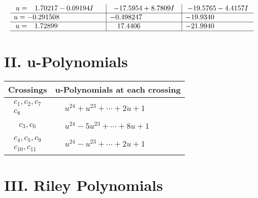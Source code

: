 \documentclass[1p]{elsarticle_modified}
\theoremstyle{definition}
\begin{document}
$$\begin{array}{c|c|c}
\begin{aligned}
u &= \phantom{-}1.70217 - 0.09194 I\end{aligned}
 & -17.5954 + 8.7809 I & -19.5765 - 4.4157 I \\ \hline\begin{aligned}
u &= -0.291508\phantom{ +0.000000I}\end{aligned}
 & -0.498247\phantom{ +0.000000I} & -19.9340\phantom{ +0.000000I} \\ \hline\begin{aligned}
u &= \phantom{-}1.72899\phantom{ +0.000000I}\end{aligned}
 & \phantom{-}17.4406\phantom{ +0.000000I} & -21.9940\phantom{ +0.000000I}\\
 \hline 
 \end{array}$$\newpage
\newpage\renewcommand{\arraystretch}{1}
\centering \section*{ II. u-Polynomials}
\begin{tabular}{m{50pt}|m{274pt}}
Crossings & \hspace{64pt}u-Polynomials at each crossing \\
\hline $$\begin{aligned}c_{1},c_{2},c_{7}\\c_{8}\end{aligned}$$&$\begin{aligned}
&u^{24}+u^{23}+\cdots+2 u+1
\end{aligned}$\\
\hline $$\begin{aligned}c_{3},c_{6}\end{aligned}$$&$\begin{aligned}
&u^{24}-5 u^{23}+\cdots+8 u+1
\end{aligned}$\\
\hline $$\begin{aligned}c_{4},c_{5},c_{9}\\c_{10},c_{11}\end{aligned}$$&$\begin{aligned}
&u^{24}- u^{23}+\cdots+2 u+1
\end{aligned}$\\
\hline
\end{tabular}\newpage\renewcommand{\arraystretch}{1}
\centering \section*{ III. Riley Polynomials}
\end{document}

